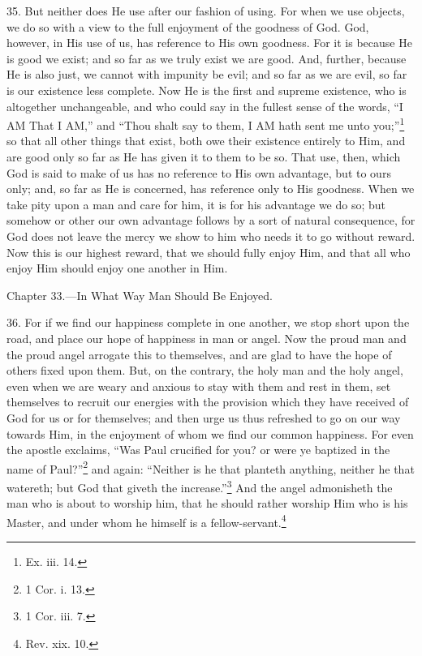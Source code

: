 35. But neither does He use after our fashion of using. For when we use objects, we do so with a view to the full enjoyment of the goodness of God. God, however, in His use of us, has reference to His own goodness. For it is because He is good we exist; and so far as we truly exist we are good. And, further, because He is also just, we cannot with impunity be evil; and so far as we are evil, so far is our existence less complete. Now He is the first and supreme existence, who is altogether unchangeable, and who could say in the fullest sense of the words, “I AM That I AM,” and “Thou shalt say to them, I AM hath sent me unto you;”\footnote{Ex. iii. 14.} so that all other things that exist, both owe their existence entirely to Him, and are good only so far as He has given it to them to be so. That use, then, which God is said to make of us has no reference to His own advantage, but to ours only; and, so far as He is concerned, has reference only to His goodness.  When we take pity upon a man and care for him, it is for his advantage we do so; but somehow or other our own advantage follows by a sort of natural consequence, for God does not leave the mercy we show to him who needs it to go without reward. Now this is our highest reward, that we should fully enjoy Him, and that all who enjoy Him should enjoy one another in Him.


Chapter 33.—In What Way Man Should Be Enjoyed.

36. For if we find our happiness complete in one another, we stop short upon the road, and place our hope of happiness in man or angel. Now the proud man and the proud angel arrogate this to themselves, and are glad to have the hope of others fixed upon them. But, on the contrary, the holy man and the holy angel, even when we are weary and anxious to stay with them and rest in them, set themselves to recruit our energies with the provision which they have received of God for us or for themselves; and then urge us thus refreshed to go on our way towards Him, in the enjoyment of whom we find our common happiness. For even the apostle exclaims, “Was Paul crucified for you? or were ye baptized in the name of Paul?”\footnote{1 Cor. i. 13.} and again: “Neither is he that planteth anything, neither he that watereth; but God that giveth the increase.”\footnote{1 Cor. iii. 7.} And the angel admonisheth the man who is about to worship him, that he should rather worship Him who is his Master, and under whom he himself is a fellow-servant.\footnote{Rev. xix. 10.}

